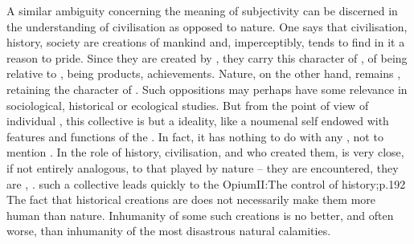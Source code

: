 \label{civObjSubj} A similar ambiguity concerning
the meaning of subjectivity can be
discerned in the understanding of civilisation as opposed to nature. One says
that civilisation, history, society are creations of mankind and, imperceptibly,
tends to find in it a reason to pride.  Since they are created by , they
carry this character of , of being relative to , being
 products,  achievements. Nature, on the other hand, remains
, retaining the character of . Such
oppositions may perhaps have some relevance in sociological, historical or
ecological studies. But from the point of view of individual ,
this collective  is but a  ideality, like a noumenal self
endowed with features and functions of the . In fact, it
has nothing to do with any , not to mention .  In  the role of history, civilisation, and  who created them,
is very close, if not entirely analogous, to that played by nature -- they
are encountered, they are ,  .
 such a collective  leads quickly to 
the \citet{idolatry of history [which] is born of this unavowed nostalgia for a
  future which would justify the unjustifiable.}{Opium}{II:The control of
  history;p.192} The fact that historical creations are  does not
necessarily make them more human than nature. Inhumanity of some such creations
is no better, and often worse, than inhumanity of the most disastrous natural
calamities.

